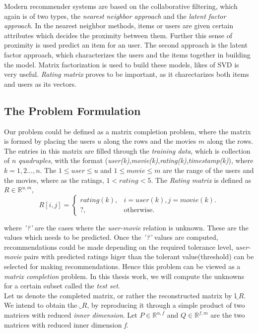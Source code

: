 Modern recommender systems are based on the collaborative filtering, which again
is of two types, the \emph{nearest neighbor approach} and the \emph{latent
factor approach}. In the nearest neighbor methods, items or users are given
certain attributes which decides the proximity between them. Further this sense
of proximity is used predict an item for an user. The second approach is
the latent factor approach, which characterizes the users and the items together
in building the model. Matrix factorization is used to build these models, likes
of SVD is very useful. \emph{Rating matrix} proves to be important, as it
charectarizes both items and users as its vectors. 

\subsection{The Problem Formulation}
Our problem could be defined as a matrix completion problem, where the matrix is
formed by placing the users $u$ along the rows and the movies $m$ along the
rows. The entries in this matrix are filled through the \emph{training data},
which is collection of $n$ \emph{quadruples}, with the format
(\emph{user(k)},\emph{movie(k)},\emph{rating(k)},\emph{timestamp(k)}), where
$k=1,2...,n$. The $1 \leq user \leq u$ and $1 \leq movie \leq m$ are the
range of the users and the movies, where as the ratings, $1<rating<5$. The
\emph{Rating
matrix} is defined as $R\in\mathbb{R}^{u,m}$, \\
\begin{equation}
  R[i,j]=\begin{cases}
    rating(k), & \text{$i=user(k), j=movie(k)$}.\\
    ?, & \text{otherwise}.
  \end{cases}
\end{equation}

where \emph{'?'} are the cases where the \emph{user-movie} relation is unknown.
These are the values which needs to be predicted. Once the \emph{'?'} values are
computed, recommendations could be made depending on the required tolerance
level, \emph{user-movie} pairs with predicted ratings higer than the tolerant
value(threshold) can be selected for making recommendations. Hence this problem
can be viewed as a \emph{matrix completion} problem. In this thesis work, we
will compute the unknowns for a certain subset called the \emph{test set}. \\

Let us denote the completed matrix, or rather the reconstructed matrix	by 
l\emph{$\hat_{R}$}. We intend to obtain the
\emph{$\hat_{R}$}, by reproducing it through a simple product of two matrices
with reduced \emph{inner dimension}. Let $P\in\mathbb{R}^{u,f}$ and
$Q\in\mathbb{R}^{f,m}$ are the two matrices with reduced inner dimension
\emph{f}. 


